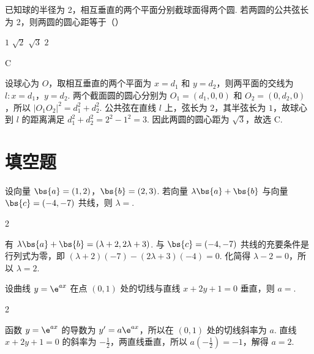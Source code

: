 \begin{problem}
已知球的半径为 2，相互垂直的两个平面分别截球面得两个圆. 若两圆的公共弦长为 2，则两圆的圆心距等于（\quad）

\choices
    {\(1\)}
    {\(\sqrt{2}\)}
    {\(\sqrt{3}\)}
    {\(2\)}
\end{problem}

\begin{answer}
C
\end{answer}

\begin{solution}
设球心为 \(O\)，取相互垂直的两个平面为 \(x=d_1\) 和 \(y=d_2\)，则两平面的交线为 \(l\colon x=d_1\)，\(y=d_2\). 两个截面圆的圆心分别为 \(O_1=(d_1,0,0)\) 和 \(O_2=(0,d_2,0)\)，所以 \(|O_1O_2|^2=d_1^2+d_2^2\). 公共弦在直线 \(l\) 上，弦长为 \(2\)，其半弦长为 \(1\)，故球心到 \(l\) 的距离满足 \(d_1^2+d_2^2=2^2-1^2=3\). 因此两圆的圆心距为 \(\sqrt{3}\)，故选 C.
\end{solution}

\section{填空题}

\begin{problem}
设向量 \( \bs{a}=(1,2) \)，\( \bs{b}=(2,3) \). 若向量 \( \lambda\bs{a}+\bs{b} \) 与向量 \( \bs{c}=(-4,-7) \) 共线，则 \(\lambda=\)\fillinblank{}.
\end{problem}

\begin{answer}
2
\end{answer}

\begin{solution}
有 \(\lambda\bs{a}+\bs{b}=(\lambda+2,2\lambda+3)\). 与 \(\bs{c}=(-4,-7)\) 共线的充要条件是行列式为零，即 \((\lambda+2)(-7)-(2\lambda+3)(-4)=0\). 化简得 \(\lambda-2=0\)，所以 \(\lambda=2\).
\end{solution}

\begin{problem}
设曲线 \( y = \e^{ax} \) 在点 \( (0,1) \) 处的切线与直线 \( x + 2y + 1 = 0 \) 垂直，则 \(a=\)\fillinblank{}.
\end{problem}

\begin{answer}
2
\end{answer}

\begin{solution}
函数 \(y=\e^{ax}\) 的导数为 \(y'=a\e^{ax}\)，所以在 \((0,1)\) 处的切线斜率为 \(a\). 直线 \(x+2y+1=0\) 的斜率为 \(-\frac12\)，两直线垂直，所以 \(a\left(-\frac12\right)=-1\)，解得 \(a=2\).
\end{solution}

